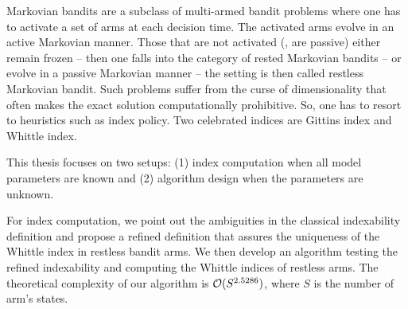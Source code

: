 Markovian bandits are a subclass of multi-armed bandit problems where one has to activate a set of arms at each decision time.
The activated arms evolve in an active Markovian manner.
Those that are not activated (\ie, are passive) either remain frozen -- then one falls into the category of rested Markovian bandits -- or evolve in a passive Markovian manner -- the setting is then called restless Markovian bandit.
Such problems suffer from the curse of dimensionality that often makes the exact solution computationally prohibitive.
So, one has to resort to heuristics such as index policy.
Two celebrated indices are Gittins index and Whittle index.

This thesis focuses on two setups: (1) index computation when all model parameters are known and (2) algorithm design when the parameters are unknown.

For index computation, we point out the ambiguities in the classical indexability definition and propose a refined definition that assures the uniqueness of the Whittle index in restless bandit arms.
We then develop an algorithm testing the refined indexability and computing the Whittle indices of restless arms.
The theoretical complexity of our algorithm is $\mathcal{O}(S^{2.5286})$, where $S$ is the number of arm's states.

